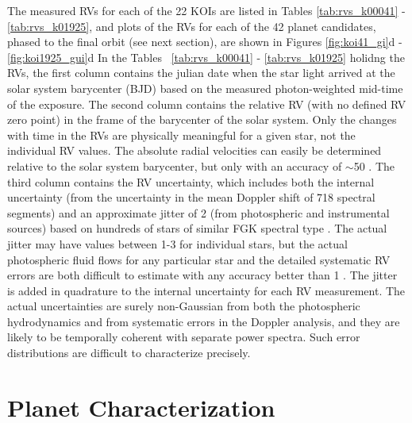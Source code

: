\documentclass{emulateapj}
\begin{document}
The measured RVs for each of the 22 KOIs are listed in Tables 
\ref{tab:rvs_k00041} - \ref{tab:rvs_k01925},
and plots of the RVs for each of the 42 planet candidates, phased to
the final orbit (see next section), are shown in Figures \ref{fig:koi41_gi}d - \ref{fig:koi1925_gui}d %
In the Tables ~\ref{tab:rvs_k00041} - \ref{tab:rvs_k01925} 
holidng the RVs, the first column contains the julian date when the star light
 arrived at the solar system barycenter (BJD) based on the measured
 photon-weighted mid-time of the exposure.  The second column contains
 the relative RV (with no defined RV zero point) in the frame of the
 barycenter of the solar system.  Only the changes with time in the
 RVs are physically meaningful for a given star, not the individual RV
 values.  The absolute radial velocities can easily be determined
 relative to the solar system barycenter, but only with an accuracy of
 $\sim$50 \ms \citep{Chubak2012}. The third column contains the RV
 uncertainty, which includes both the internal uncertainty (from the
 uncertainty in the mean Doppler shift of 718 spectral segments) and
 an approximate jitter of 2 \ms (from photospheric and instrumental
 sources) based on hundreds of stars of similar FGK spectral type
 \citep{Isaacson2010}.  The actual jitter may have values between 1-3
 \ms for individual stars, but the actual photospheric fluid flows for
 any particular star and the detailed systematic RV errors are both
 difficult to estimate with any accuracy better than 1 \ms. The jitter
 is added in quadrature to the internal uncertainty for each RV
 measurement. The actual uncertainties are surely non-Gaussian from
 both the photospheric hydrodynamics and from systematic errors in the
 Doppler analysis, and they are likely to be temporally coherent with
 separate power spectra.  Such error distributions are difficult to
 characterize precisely.

\section{Planet Characterization}
\label{sec:planetchar}
\end{document}
